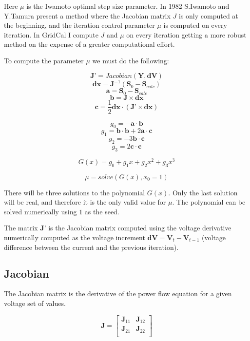 \documentclass[11pt,fleqn]{book} %
\begin{document}
Here $\mu$ is the Iwamoto optimal step size parameter. In 1982 S.Iwamoto and Y.Tamura present a method \cite{iwamoto1981load} where the Jacobian matrix $J$ is only computed at the beginning, and the iteration control parameter $\mu$ is computed on every iteration. In GridCal I compute $J$ and $\mu$ on every iteration getting a more robust method on the expense of a greater computational effort.

To compute the parameter $\mu$ we must do the following:

\begin{theorem}[Computation of $\mu$]
$$\textbf{J'} = Jacobian(\textbf{Y}, \textbf{dV})$$
$$\textbf{dx} = \textbf{J}^{-1}(\textbf{S}_0 - \textbf{S}_{calc})$$
$$\textbf{a} = \textbf{S}_0 - \textbf{S}_{calc}$$
$$\textbf{b} = \textbf{J} \times \textbf{dx}$$
$$\textbf{c} = \frac{1}{2} \textbf{dx} \cdot (\textbf{J'} \times \textbf{dx})$$

$$g_0 = -\textbf{a} \cdot \textbf{b}$$
$$g_1 = \textbf{b} \cdot \textbf{b} + 2  \textbf{a} \cdot \textbf{c}$$
$$g_2 = -3  \textbf{b} \cdot \textbf{c}$$
$$g_3 = 2  \textbf{c} \cdot \textbf{c}$$

$$G(x) = g_0 + g_1x + g_2x^2 + g_3x^3$$

$$\mu = solve(G(x), x_0=1)$$
\end{theorem}


There will be three solutions to the polynomial $G(x)$. Only the last solution will be real, and therefore it is the only valid value for $\mu$.
The polynomial can be solved numerically using $1$ as the seed.

The matrix $\textbf{J'}$ is the Jacobian matrix computed using the voltage derivative numerically computed as the voltage increment $\textbf{dV}= \textbf{V}_{t} - \textbf{V}_{t-1}$ (voltage difference between the current and the previous iteration).  

\newpage
\subsection{Jacobian}

The Jacobian matrix is the derivative of the power flow equation for a given voltage set of values.

\begin{equation}
\textbf{J} =
\begin{bmatrix}
\textbf{J}_{11} & \textbf{J}_{12} \\
\textbf{J}_{21} & \textbf{J}_{22} \\
\end{bmatrix}
\end{equation}
\end{document}
